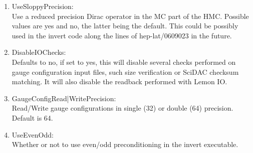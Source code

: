 \begin{enumerate}
\item {\ttfamily UseSloppyPrecision}:\\
  Use a reduced precision Dirac operator in the MC part of the
  HMC. Possible values are yes and no, the latter being the
  default. This could be possibly used in the invert code along the 
  lines of {\ttfamily hep-lat/0609023} in the future.

\item {\ttfamily DisableIOChecks}:\\
  Defaults to no, if set to yes, this will disable several checks
  performed on gauge configuration input files, such size verification or
  SciDAC checksum matching. It will also disable the readback performed with
  Lemon IO.

\item {\ttfamily GaugeConfigRead|WritePrecision}:\\
  Read/Write gauge configurations in single (32) or double (64)
  precision. Default is 64.

\item {\ttfamily UseEvenOdd}:\\
  Whether or not to use even/odd preconditioning in the invert
  executable.

\end{enumerate}

